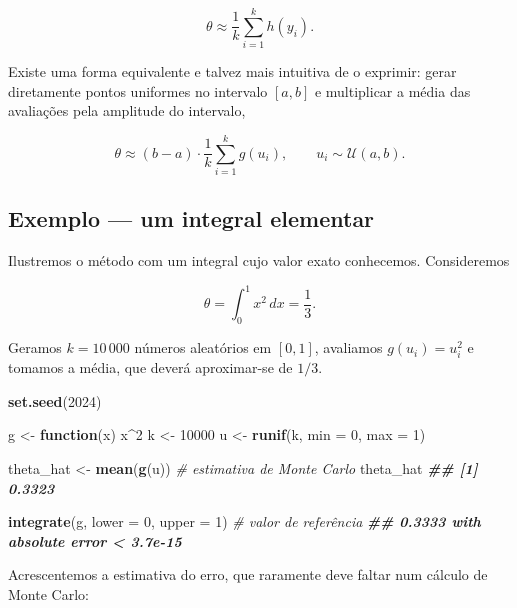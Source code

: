 \documentclass[
  portuguese,
  11pt,
  openany]{book}
\newenvironment{Shaded}{\begin{snugshade}}{\end{snugshade}}
\newcommand{\AttributeTok}[1]{\textcolor[rgb]{0.13,0.29,0.53}{#1}}
\newcommand{\CommentTok}[1]{\textcolor[rgb]{0.56,0.35,0.01}{\textit{#1}}}
\newcommand{\ControlFlowTok}[1]{\textcolor[rgb]{0.13,0.29,0.53}{\textbf{#1}}}
\newcommand{\DecValTok}[1]{\textcolor[rgb]{0.00,0.00,0.81}{#1}}
\newcommand{\DocumentationTok}[1]{\textcolor[rgb]{0.56,0.35,0.01}{\textbf{\textit{#1}}}}
\newcommand{\FunctionTok}[1]{\textcolor[rgb]{0.13,0.29,0.53}{\textbf{#1}}}
\newcommand{\NormalTok}[1]{#1}
\newcommand{\OtherTok}[1]{\textcolor[rgb]{0.56,0.35,0.01}{#1}}
\newcommand{\SpecialCharTok}[1]{\textcolor[rgb]{0.81,0.36,0.00}{\textbf{#1}}}
\begin{document}
\[
\theta \approx \frac{1}{k}\sum_{i=1}^{k} h(y_i).
\]

Existe uma forma equivalente e talvez mais intuitiva de o exprimir: gerar
diretamente pontos uniformes no intervalo \([a, b]\) e multiplicar a média das
avaliações pela amplitude do intervalo,

\[
\theta \approx (b - a)\cdot \frac{1}{k}\sum_{i=1}^{k} g(u_i),
\qquad u_i \sim \mathcal{U}(a, b).
\]

\subsection{Exemplo --- um integral elementar}\label{exemplo-um-integral-elementar}

Ilustremos o método com um integral cujo valor exato conhecemos. Consideremos

\[
\theta = \int_{0}^{1} x^2\, dx = \frac{1}{3}.
\]

Geramos \(k = 10\,000\) números aleatórios em \([0,1]\), avaliamos \(g(u_i) = u_i^2\)
e tomamos a média, que deverá aproximar-se de \(1/3\).

\begin{Shaded}
\begin{Highlighting}[]
\FunctionTok{set.seed}\NormalTok{(}\DecValTok{2024}\NormalTok{)}

\NormalTok{g }\OtherTok{\textless{}{-}} \ControlFlowTok{function}\NormalTok{(x) x}\SpecialCharTok{\^{}}\DecValTok{2}
\NormalTok{k }\OtherTok{\textless{}{-}} \DecValTok{10000}
\NormalTok{u }\OtherTok{\textless{}{-}} \FunctionTok{runif}\NormalTok{(k, }\AttributeTok{min =} \DecValTok{0}\NormalTok{, }\AttributeTok{max =} \DecValTok{1}\NormalTok{)}

\NormalTok{theta\_hat }\OtherTok{\textless{}{-}} \FunctionTok{mean}\NormalTok{(}\FunctionTok{g}\NormalTok{(u))              }\CommentTok{\# estimativa de Monte Carlo}
\NormalTok{theta\_hat}
\DocumentationTok{\#\# [1] 0.3323}

\FunctionTok{integrate}\NormalTok{(g, }\AttributeTok{lower =} \DecValTok{0}\NormalTok{, }\AttributeTok{upper =} \DecValTok{1}\NormalTok{)   }\CommentTok{\# valor de referência}
\DocumentationTok{\#\# 0.3333 with absolute error \textless{} 3.7e{-}15}
\end{Highlighting}
\end{Shaded}

Acrescentemos a estimativa do erro, que raramente deve faltar num cálculo de
Monte Carlo:
\end{document}
